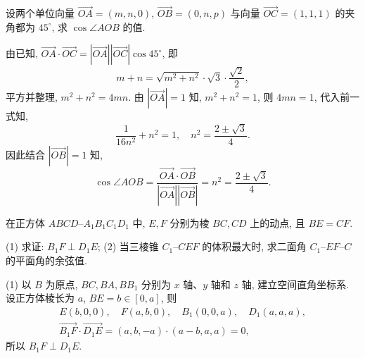 \begin{exercise}
    设两个单位向量 $\overrightarrow{OA}= (m,n,0)$, $\overrightarrow{OB}= (0,n,p)$ 与向量 $\overrightarrow{OC}= (1,1,1)$ 的夹角都为 $45^\circ$, 求 $\cos\angle AOB$ 的值. 
\end{exercise}
\beginsolution
    由已知, $\overrightarrow{OA}\cdot \overrightarrow{OC}= |\overrightarrow{OA}| |\overrightarrow{OC}|\cos 45^\circ$, 即
    \[m+n= \sqrt{m^2+n^2}\cdot \sqrt3\cdot \frac{\sqrt2}{2},\]
    平方并整理, $m^2+n^2= 4mn$. 由 $|\overrightarrow{OA}|= 1$ 知, $m^2+n^2= 1$, 则 $4mn=1$, 代入前一式知,
    \[\frac{1}{16n^2}+ n^2= 1,\quad n^2= \frac{2\pm\sqrt3}4.\]
    因此结合 $|\overrightarrow{OB}|= 1$ 知, 
    \[\cos\angle AOB
    = \frac{\overrightarrow{OA}\cdot \overrightarrow{OB}}{
        |\overrightarrow{OA}| |\overrightarrow{OB}|}
    = n^2= \frac{2\pm\sqrt3}4.\]
\endsolution
        
      
        

\begin{exercise}
    在正方体 $ABCD\text{--}A_1B_1C_1D_1$ 中, $E,F$ 分别为棱 $BC, CD$ 上的动点, 且 $BE= CF$.
    
    (1) 求证: $B_1F\perp D_1E$;\qquad 
    (2) 当三棱锥 $C_1\text{--}CEF$ 的体积最大时, 求二面角 $C_1\text{--}EF\text{--}C$ 的平面角的余弦值.
\end{exercise}
\beginsolution
    (1) 以 $B$ 为原点, $BC, BA, BB_1$ 分别为 $x$ 轴、$y$ 轴和 $z$ 轴, 建立空间直角坐标系. 设正方体棱长为 $a$, $BE=b\in [0,a]$, 则
    \[\begin{gathered}
        E(b,0,0),\quad F(a,b,0),\quad 
        B_1(0,0,a),\quad D_1(a,a,a),\\
        \overrightarrow{B_1F}\cdot \overrightarrow{D_1E}
        = (a,b,-a)\cdot (a-b,a,a)= 0,
    \end{gathered}\]
    所以 $B_1F\perp D_1E$.

